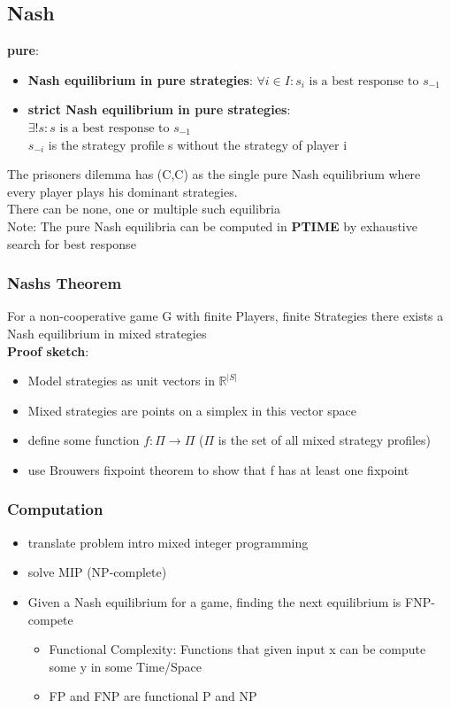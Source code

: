 \documentclass[12pt,a4paper]{article}
\begin{document}
\subsection{Nash}

\textbf{pure}:\\
\begin{itemize}
\setlength\itemsep{0.05cm}
\item \textbf{Nash equilibrium in pure strategies}: $\forall i \in I: s_i \text{ is a best response to } s_{-1}$
\item \textbf{strict Nash equilibrium in pure strategies}: $\exists ! s: s \text{ is a best response to } s_{-1}$\\
$s_{-i}$ is the strategy profile s without the strategy of player i
\end{itemize}
The prisoners dilemma has (C,C) as the single pure Nash equilibrium where every player plays his dominant strategies.\\
There can be none, one or multiple such equilibria\\
Note: The pure Nash equilibria can be computed in \textbf{PTIME} by exhaustive search for best response\\
\subsubsection{Nashs Theorem}
For a non-cooperative game G with finite Players, finite Strategies there exists a Nash equilibrium in mixed strategies\\
\textbf{Proof sketch}:
\begin{itemize}
\setlength\itemsep{0.05cm}
\item Model strategies as unit vectors in $\mathbb{R}^{|S|}$
\item Mixed strategies are points on a simplex in this vector space
\item define some function $f : \Pi \rightarrow \Pi$ ($\Pi$ is the set of all mixed strategy profiles)
\item use Brouwers fixpoint theorem to show that f has at least one fixpoint
\end{itemize}
\subsubsection{Computation}
\begin{itemize}
\item translate problem intro mixed integer programming
\item solve MIP (NP-complete)
\item Given a Nash equilibrium for a game, finding the next equilibrium is FNP-compete
\begin{itemize}
\item Functional Complexity: Functions that given input x can be compute some y in some Time/Space
\item FP and FNP are functional P and NP
\end{itemize}
\end{itemize}
\end{document}
